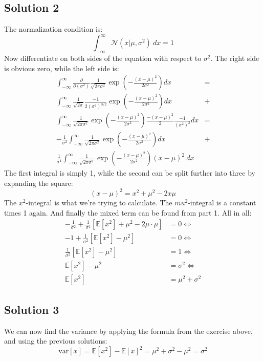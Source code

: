 \documentclass[12pt, a4paper]{article}
\numberwithin{equation}{section}
\begin{document}
\subsection{Solution 2}
The normalization condition is:
\begin{equation}
\int_{-\infty}^\infty\mathcal{N}(x|\mu,\sigma^2)\ dx=1
\end{equation}
Now differentiate on both sides of the equation with respect to $\sigma^2$. The right side is obvious zero, while the left side is:
\begin{align}
\int_{-\infty}^\infty\frac{\partial}{\partial(\sigma^2)}\frac{1}{\sqrt{2\pi\sigma^2}}\exp\left(-\frac{(x-\mu)^2}{2\sigma^2}\right)dx&=\\
\int_{-\infty}^\infty\frac{1}{\sqrt{2\pi}}\frac{-1}{2(\sigma^2)^{3/2}}\exp\left(-\frac{(x-\mu)^2}{2\sigma^2}\right)dx&+\\
\int_{-\infty}^\infty\frac{1}{\sqrt{2\pi\sigma^2}}\exp\left(-\frac{(x-\mu)^2}{2\sigma^2}\right)\frac{-(x-\mu)^2}{2}\frac{-1}{(\sigma^2)^2}dx&=\\
-\frac{1}{\sigma^2}\int_{-\infty}^\infty\frac{1}{\sqrt{2\pi\sigma^2}}\exp\left(-\frac{(x-\mu)^2}{2\sigma^2}\right)dx&+\\
\frac{1}{\sigma^4}\int_{-\infty}^\infty\frac{1}{\sqrt{2\pi\sigma^2}}\exp\left(-\frac{(x-\mu)^2}{2\sigma^2}\right)(x-\mu)^2\ dx&
\end{align}
The first integral is simply 1, while the second can be split further into three by expanding the square:
\begin{equation}
(x-\mu)^2=x^2+\mu^2-2x\mu
\end{equation}
The $x^2$-integral is what we're trying to calculate. The $mu^2$-integral is a constant times 1 again. And finally the mixed term can be found from part 1. All in all:
\begin{align}
-\frac{1}{\sigma^2}+\frac{1}{\sigma^4}\left[\mathbb{E}[x^2]+\mu^2-2\mu\cdot\mu\right]&=0\Leftrightarrow\\
-1+\frac{1}{\sigma^2}\left[\mathbb{E}[x^2]-\mu^2\right]&=0\Leftrightarrow\\
\frac{1}{\sigma^2}\left[\mathbb{E}[x^2]-\mu^2\right]&=1\Leftrightarrow\\
\mathbb{E}[x^2]-\mu^2&=\sigma^2\Leftrightarrow\\
\mathbb{E}[x^2]&=\mu^2+\sigma^2
\end{align}

\subsection{Solution 3}
We can now find the variance by applying the formula from the exercise above, and using the previous solutions:
\begin{equation}
\textrm{var}[x]=\mathbb{E}[x^2]-\mathbb{E}[x]^2=\mu^2+\sigma^2-\mu^2=\sigma^2
\end{equation}
\end{document}
